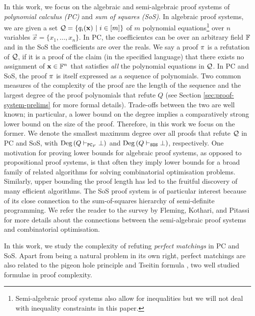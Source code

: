 \documentclass[11pt]{article}
\begin{document}
In this work, we focus on the algebraic and semi-algebraic proof systems of \emph{polynomial calculus (PC)} and \emph{sum of squares (SoS)}. %
In algebraic proof systems, we are given a set $\mathcal{Q} =\{q_i(\mathbf{x}) \text{ } |\text{ } i \in [m] \}$ of $m$ polynomial equations\footnote{Semi-algebraic proof systems also allow for inequalities but we will not deal with inequality constraints in this paper.} over $n$ variables $\vec{x} = \{x_1, \dots, x_n\}$.
In PC, the coefficientcs can be over an arbitrary field $\mathbb{F}$ and in the SoS the coefficients are  over the reals.
We say a proof $\pi$ is a refutation of $\mathcal{Q}$, if it is a proof of the claim (in the specified language) that there exists no assignment of $\mathbf{x} \in \mathbb{F}^n$ that satisfies \emph{all} the polynomial equations in $\mathcal{Q}$.
In PC and SoS, the proof $\pi$ is itself expressed as a sequence of polynomials.
Two common measures of the complexity of the proof are the length of the sequence and the largest degree of the proof polynomials that refute $Q$ (see Section \ref{sec:proof-system-prelims} for more formal details).
Trade-offs between the two are well known; in particular, a lower bound on the degree implies a comparatively strong lower bound on the size of the proof.
Therefore, in this work we focus on the former. We denote the smallest maximum degree over all proofs that refute $\mathcal{Q}$ in PC and SoS, with $\text{Deg}\left(Q \vdash_{\texttt{PC}_F} \bot\right)$ and $\text{Deg}\left(Q \vdash_{\texttt{SOS}} \bot\right)$, respectively.
One motivation for proving lower bounds for algebraic proof systems, as opposed to propositional proof systems, is that often they imply lower bounds for a broad family of related algorithms for solving combinatorial optimisation problems.
Similarly, upper bounding the proof length has led to the fruitful discovery of many efficient algorithms.
The SoS proof system is of particular interest because of its close connection to the sum-of-squares hierarchy of semi-definite programming.
We refer the reader to the survey by Fleming, Kothari, and Pitassi \cite{fleming2019semialgebraic} for more details about the connections between the semi-algebraic proof systems and combinatorial optimisation.\par
In this work, we study the complexity of refuting \emph{perfect matchings} in PC and SoS.
Apart from being a natural problem in its own right, perfect matchings are also related to the pigeon hole principle \citep{maciel2000new, pitassi1993exponential, raz2004resolution, razbarov2002pgp, razborov2003resolution} and Tseitin formula \citep{filmus2013towards, galesi2019bounded, glinskih2017satisfiable, grigoriev2001linear}, two well studied formulae in proof complexity.
\end{document}
